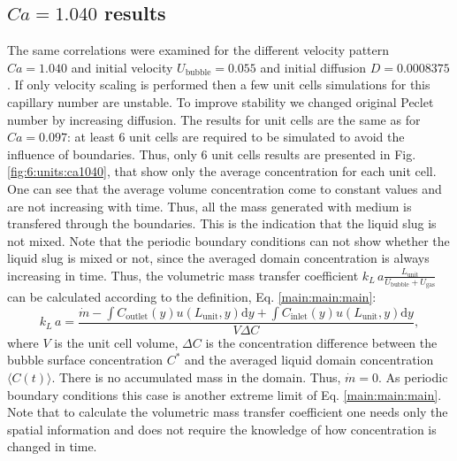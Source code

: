 \documentclass{article}
\newcommand{\beq}{\begin{equation}}
\newcommand{\feq}{\end{equation}}
\newcommand{\vol}{k_L\,a}
\newcommand{\lunit}{L_{\mathrm{unit}}}
\newcommand{\ububble}{U_{\mathrm{bubble}}}
\newcommand{\ugas}{U_{\mathrm{gas}}}
\newcommand{\cinlet}{C_{\mathrm{inlet}}}
\newcommand{\coutlet}{C_{\mathrm{outlet}}}
\newcommand{\cstar}{C^{*}}
\newcommand{\volnondim}{\vol \frac{\lunit}{\ububble+\ugas}}
\begin{document}
\subsection{$Ca=1.040$ results}
The same correlations were examined for the different velocity pattern $Ca=1.040$ and initial
velocity $\ububble=0.055$ and initial diffusion $D=0.0008375$. If only velocity scaling is
performed then a few unit cells simulations for
this capillary number  are unstable. To improve stability we changed original Peclet number by
increasing
diffusion. The results for unit cells are the same as for $Ca=0.097$:
at least $6$ unit cells are required to be simulated to avoid the influence of boundaries. Thus,
only $6$ unit cells results are presented in Fig. \ref{fig:6:units:ca1040}, that show only the
average concentration for each unit cell. One can see that the average volume concentration come to
constant values and are not increasing with time. Thus, all the
mass generated with medium is transfered through the boundaries. This is the indication that the
liquid slug is not mixed. Note that the periodic boundary conditions can not show whether the
liquid slug is mixed or not, since the averaged domain concentration is always increasing in time. 
Thus, the volumetric mass transfer coefficient $\volnondim$ can be calculated according to the
definition, Eq. \ref{main:main:main}:
\beq
\label{inlet:outlet:spatial:location}
\vol =
\frac{\dot{m}-\int{\coutlet(y)u(\lunit,y)\mathrm{d}y}+\int{\cinlet(y)u(\lunit,y)\mathrm{d}y}}{V
\Delta C},
\feq 
where $V$ is the unit cell volume, $\Delta C$ is the concentration difference between the bubble
surface concentration $\cstar$ and the averaged liquid domain concentration $\langle
C(t)\rangle$. There is no accumulated mass in the domain. Thus, $\dot{m}=0$. As periodic boundary
conditions this case is another extreme limit of Eq. \ref{main:main:main}. Note that to calculate
the volumetric mass transfer coefficient one needs only the spatial information and does not
require the knowledge of how concentration is changed in time. 
\end{document}

